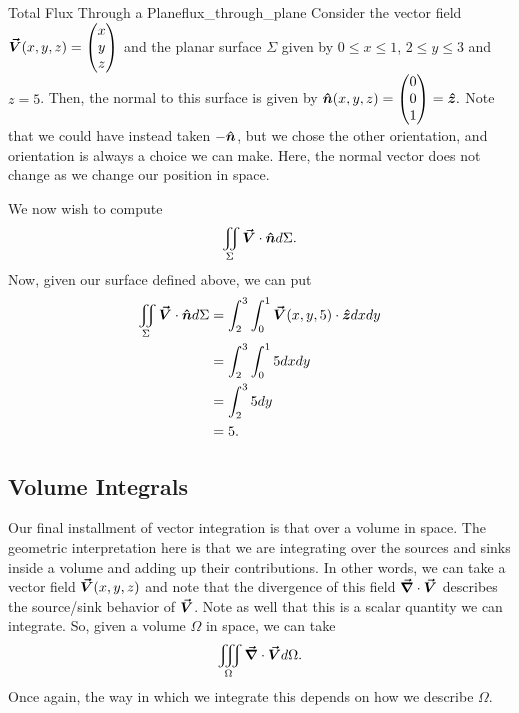         \begin{ex}{Total Flux Through a Plane}{flux_through_plane}
        	Consider the vector field $\boldsymbol{\vec{V}}(x,y,z) = \begin{pmatrix} x \\ y \\ z \end{pmatrix}$ and the planar surface $\Sigma$ given by $0\leq x \leq 1$, $2\leq y \leq 3$ and $z=5$.  Then, the normal to this surface is given by $\boldsymbol{\hat{n}}(x,y,z) = \begin{pmatrix} 0 \\ 0 \\ 1 \end{pmatrix} = \boldsymbol{\hat{z}}.$ Note that we could have instead taken $-\boldsymbol{\hat{n}}$, but we chose the other orientation, and orientation is always a choice we can make.  Here, the normal vector does not change as we change our position in space.
        	
        	We now wish to compute
        	\[
        	\iint_\Sigma \boldsymbol{\vec{V}} \cdot \boldsymbol{\hat{n}} d\Sigma.
        	\]
        	Now, given our surface defined above, we can put
        	\begin{align*}
        	\iint_\Sigma \boldsymbol{\vec{V}} \cdot \boldsymbol{\hat{n}} d\Sigma &= \int_2^3 \int_0^1 \boldsymbol{\vec{V}}(x,y,5) \cdot \boldsymbol{\hat{z}} dxdy\\
        	&= \int_2^3 \int_0^1 5 dx dy\\
        	&= \int_2^3 5 dy\\
        	&= 5.
        	\end{align*}
        \end{ex}
        
        
         \subsection{Volume Integrals}
         
         Our final installment of vector integration is that over a volume in space.  The geometric interpretation here is that we are integrating over the sources and sinks inside a volume and adding up their contributions.  In other words, we can take a vector field $\boldsymbol{\vec{V}}(x,y,z)$ and note that the divergence of this field $\boldsymbol{\vec{\nabla}} \cdot \boldsymbol{\vec{V}}$ describes the source/sink behavior of $\boldsymbol{\vec{V}}$.  Note as well that this is a scalar quantity we can integrate.  So, given a volume $\Omega$ in space, we can take
         \[
         \iiint_\Omega \boldsymbol{\vec{\nabla}} \cdot \boldsymbol{\vec{V}} d\Omega.
         \]         
         Once again, the way in which we integrate this depends on how we describe $\Omega$.  
         

